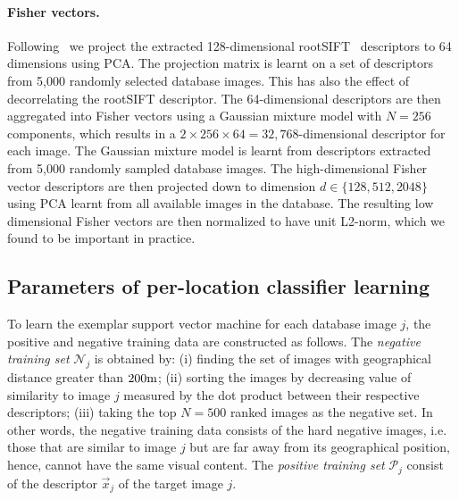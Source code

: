       \paragraph{Fisher vectors.}
        Following~\cite{Jegou12} we project the extracted 128-dimensional rootSIFT~\cite{Arandjelovic12} descriptors to 64 dimensions using PCA. The projection matrix is learnt on a set of descriptors from 5,000 randomly selected database images. This has also the effect of decorrelating the rootSIFT descriptor. The 64-dimensional descriptors are then aggregated into Fisher vectors using a Gaussian mixture model with $N=256$ components, which results in a $2\times256\times64 = 32,768$-dimensional descriptor for each image.  
        The Gaussian mixture model is learnt from descriptors extracted from 5,000 randomly sampled database images. The  high-dimensional Fisher vector descriptors are then projected down to dimension $d\in\{128,512, 2048\}$ using PCA learnt from all available images in the database. The resulting low dimensional Fisher vectors are then normalized to have unit L2-norm, which we found to be important in practice.
      
    \subsection{Parameters of per-location classifier learning}
      To learn the exemplar support vector machine for each database image $j$, the positive and negative training data are constructed as follows. 
      The \emph{negative training set} $\mathcal N_j$ is obtained by: (i) finding the set of images with geographical distance greater than $200{\rm m}$; (ii)  sorting the images by decreasing value of similarity to image $j$ measured by the dot product between their respective descriptors; (iii) taking the top $N=500$ ranked images as the negative set. 
      In other words, the negative training data consists of the hard negative images, i.e. those that are similar to image $j$ but are far away from its geographical position, hence, cannot have the same visual content. 
      The \emph{positive training set} $\mathcal P_j$ consist of the descriptor $\vec{x}_j$ of the target image $j$. 
      
